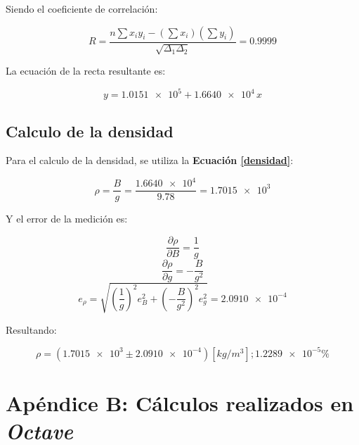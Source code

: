 \documentclass[letter,11pt]{article}
\begin{document}
Siendo el coeficiente de correlación:

\begin{equation*}
    R = \frac{n \sum x_i y_i - (\sum x_i)(\sum y_i)}{\sqrt{\Delta_1 \Delta_2}}
      = 0.9999
\end{equation*}
\vspace{0.10cm}

La ecuación de la recta resultante es:

\begin{equation*}
    y = \num{1.0151e5} + \num{1.6640e4}\,x
\end{equation*}
\vspace{0.10cm}

\subsection{Calculo de la densidad}

Para el calculo de la densidad, se utiliza la
\textbf{Ecuación \ref{densidad}}:

\begin{equation*}
    \rho = \frac{B}{g} = \frac{\num{1.6640e4}}{9.78} = \num{1.7015e3}
\end{equation*}
\vspace{0.10cm}

Y el error de la medición es:

\begin{equation*}
    \frac{\partial \rho}{\partial B} = \frac{1}{g}
\end{equation*}
\begin{equation*}
    \frac{\partial \rho}{\partial g} = -\frac{B}{g^2}
\end{equation*}
\begin{equation*}
    e_{\rho} = \sqrt{ \left(\frac{1}{g} \right)^2 e_B^2 + \left(-\frac{B}{g^2} \right)^2 e_g^2 } = \num{2.0910e-4}
\end{equation*}
\vspace{0.10cm}

Resultando:

\begin{equation*}
    \rho = (\num{1.7015e3} \pm \num{2.0910e-4}) [kg/m^3]; \num{1.2289e-5}\%
\end{equation*}
\vspace{0.10cm}

\newpage
\section*{Apéndice B: Cálculos realizados en \emph{Octave}}
\end{document}
